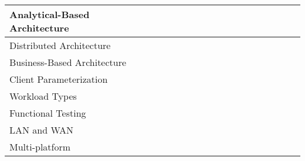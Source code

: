 \begin{sidewaystable}
\begin{tabular}{|l|c|c|c|c|c||c|c|c||c|c|c|c|c|c|c|c|c|c|}
    \hline\color{black}\scriptsize{Analytical-Based
    Architecture}& {\color{gray}\faStar{}} & {\color{gray}\faStar{}} &
    {\color{gray}\faStar{}} & {\color{gray}\faStar{}} & {\color{gray}\faStar{}} & {\color{gray}\faStarHalf*{}}& {\color{gray}\faStarHalf*{}}& {\color{gray}\faStarHalf*{}}& & & & &
    & & & \\
    
    \hline\scriptsize{Distributed Architecture}& {\color{gray}\faStar{}} &
    {\color{gray}\faStar{}} & {\color{gray}\faStar{}} &  {\color{gray}\faStar{}} & & {\color{gray}\faStar{}} & {\color{gray}\faStar{}} &  &  &  &  &  &  &
     &  & \\
    
    \hline\scriptsize{Business-Based Architecture} & & {\color{gray}\faStarHalf*{}} & & {\color{gray}\faStarHalf*{}} & {\color{gray}\faStar{}} & {\color{gray}\faStar{}} & {\color{gray}\faStar{}} & {\color{gray}\faStar{}} & & & & & & & & \\
    
    \hline\scriptsize{Client Parameterization} & {\color{gray}\faStar{}} &
    {\color{gray}\faStar{}} & & {\color{gray}\faStarHalf*{}} & {\color{gray}\faStar{}} & {\color{gray}\faStar{}} & {\color{gray}\faStar{}} & {\color{gray}\faStar{}} & & {\color{gray}\faStar{}} & & {\color{gray}\faStarHalf*{}} & & & {\color{gray}\faStarHalf*{}} &  \\
    
    \hline\scriptsize{Workload Types} & & {\color{gray}\faStar{}} & & & {\color{gray}\faStar{}} & {\color{gray}\faStar{}} &{\color{gray}\faStar{}}  & {\color{gray}\faStarHalf*{}}
    & & & & & & & & \\
    
    \hline\scriptsize{Functional Testing} & & & & & & {\color{gray}\faStar{}} &{\color{gray}\faStar{}} &  {\color{gray}\faStarHalf*{}} & & & &{\color{gray}\faStarHalf*{}} &{\color{gray}\faStarHalf*{}}
     &{\color{gray}\faStarHalf*{}} & & {\color{gray}\faStarHalf*{}}\\
    
    \hline\scriptsize{LAN and WAN}& & & & & & & & & {\color{gray}\faStar{}} & & &
    & & & & \\
    
    \hline\scriptsize{Multi-platform}&{\color{gray}\faStar{}}&{\color{gray}
    \faStar{}}&{\color{gray}\faStar{}}&{\color{gray}\faStar{}}&{
    \color{gray}\faStar{}}&{\color{gray}\faStar{}}&{\color{gray}\faStar{}}&{\color{gray}\faStar{}}&{\color{gray}\faStar{}}&{\color{gray}\faStar{}}&{\color{gray}\faStar{}}&{\color{gray}\faStarHalf*{}}&{\color{gray}\faStar{}}&{\color{gray}\faStarHalf*{}}&{\color{gray}\faStar{}}&{\color{gray}\faStar{}}\\
    

\end{tabular}
\end{sidewaystable}
